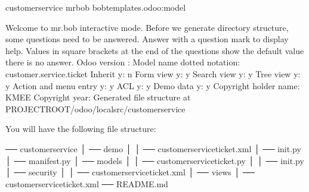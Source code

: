 \documentclass[letterpaper,10pt,english]{sphinxmanual}
\begin{document}
%
\begin{sphinxVerbatim}[commandchars=\\\{\}]
 customer\PYGZus{}service 
mrbob bobtemplates.odoo:model

Welcome to mr.bob interactive mode. Before we generate directory structure, some questions
need to be answered. Answer with a question mark to display help. Values in square
brackets at the end of the questions show the default value  there is no answer.
\PYGZhy{}\PYGZhy{}\PYGZgt{} Odoo version  \PYG{o}{[}\PYG{o}{]}: 
\PYGZhy{}\PYGZhy{}\PYGZgt{} Model name dotted notation: customer.service.ticket
\PYGZhy{}\PYGZhy{}\PYGZgt{} Inherit \PYG{o}{[}y\PYG{o}{]}: n
\PYGZhy{}\PYGZhy{}\PYGZgt{} Form view \PYG{o}{[}y\PYG{o}{]}: y
\PYGZhy{}\PYGZhy{}\PYGZgt{} Search view \PYG{o}{[}y\PYG{o}{]}: y
\PYGZhy{}\PYGZhy{}\PYGZgt{} Tree view \PYG{o}{[}y\PYG{o}{]}: y
\PYGZhy{}\PYGZhy{}\PYGZgt{} Action and menu entry \PYG{o}{[}y\PYG{o}{]}: y
\PYGZhy{}\PYGZhy{}\PYGZgt{} ACL \PYG{o}{[}y\PYG{o}{]}: y
\PYGZhy{}\PYGZhy{}\PYGZgt{} Demo data \PYG{o}{[}y\PYG{o}{]}: y
\PYGZhy{}\PYGZhy{}\PYGZgt{} Copyright holder name: KMEE
\PYGZhy{}\PYGZhy{}\PYGZgt{} Copyright year: 
Generated file structure at PROJECT\PYGZus{}ROOT/odoo/local\PYGZhy{}src/customer\PYGZus{}service
\end{sphinxVerbatim}
\sphinxresetverbatimhllines

You will have the following file structure:

\begin{sphinxVerbatim}[commandchars=\\\{\}]
── customer\PYGZus{}service
│   ── demo
│   │   ── customer\PYGZus{}service\PYGZus{}ticket.xml
│   ── \PYGZus{}\PYGZus{}init\PYGZus{}\PYGZus{}.py  
│   ── \PYGZus{}\PYGZus{}manifest\PYGZus{}\PYGZus{}.py  
│   ── models
│   │   ── customer\PYGZus{}service\PYGZus{}ticket.py 
│   │   ── \PYGZus{}\PYGZus{}init\PYGZus{}\PYGZus{}.py
│   ── security
│   │   ── customer\PYGZus{}service\PYGZus{}ticket.xml 
│   ── views
│       ── customer\PYGZus{}service\PYGZus{}ticket.xml 
── README.md
\end{sphinxVerbatim}
\end{document}
